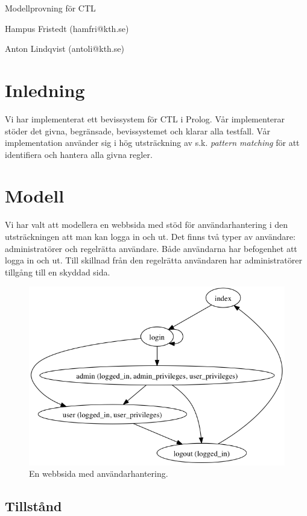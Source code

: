 \documentclass{article}
\begin{document}
  \centerline{\sc \large Modellprovning för CTL}
  \vspace{.5pc}
  \centerline{Hampus Fristedt (hamfri@kth.se)}
  \centerline{Anton Lindqvist (antoli@kth.se)}
  \vspace{2pc}

  \section{Inledning}
  Vi har implementerat ett bevissystem för CTL i Prolog. Vår implementerar
  stöder det givna, begränsade, bevissystemet och klarar alla testfall. Vår
  implementation använder sig i hög utsträckning av s.k. \emph{pattern matching}
  för att identifiera och hantera alla givna regler.

  \section{Modell}
  Vi har valt att modellera en webbsida med stöd för användarhantering i den
  utsträckningen att man kan logga in och ut. Det finns två typer av användare:
  administratörer och regelrätta användare. Både användarna har befogenhet att
  logga in och ut. Till skillnad från den regelrätta användaren har
  administratörer tillgång till en skyddad sida.
  \begin{figure}[h!]
    \centering
    \includegraphics[scale=0.4]{model.png}
    \caption{En webbsida med användarhantering.}
  \end{figure}

  \subsection{Tillstånd}
\end{document}

